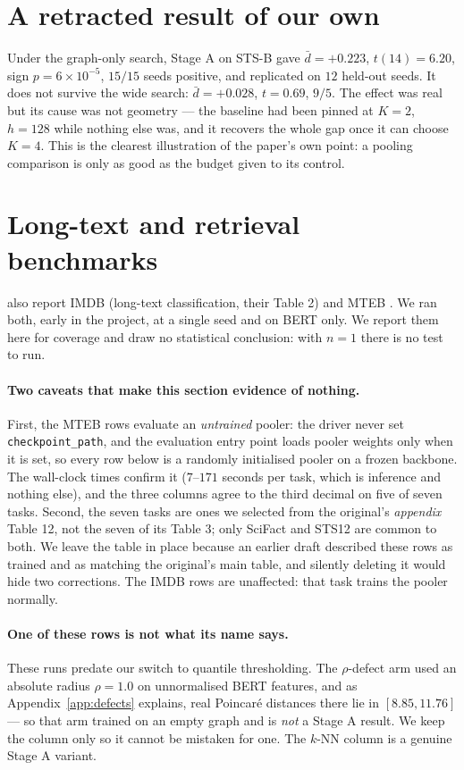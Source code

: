 \documentclass{article}
\begin{document}
\section{A retracted result of our own}
\label{app:narrow}

Under the graph-only search, Stage A on STS-B gave $\bar{d}=+0.223$,
$t(14)=6.20$, sign $p=6\times10^{-5}$, $15/15$ seeds positive, and replicated on
$12$ held-out seeds. It does not survive the wide search: $\bar{d}=+0.028$,
$t=0.69$, $9/5$. The effect was real but its cause was not geometry --- the
baseline had been pinned at $K=2$, $h=128$ while nothing else was, and it
recovers the whole gap once it can choose $K=4$. This is the clearest
illustration of the paper's own point: a pooling comparison is only as good as
the budget given to its control.

\section{Long-text and retrieval benchmarks}
\label{app:docmteb}

\citet{mantri2026glot} also report IMDB (long-text classification, their
Table 2) and MTEB \citep{muennighoff2022mteb}. We ran both, early in the
project, at a single seed and on BERT only. We report them here for coverage and
draw no statistical conclusion: with $n=1$ there is no test to run.

\paragraph{Two caveats that make this section evidence of nothing.} First, the
MTEB rows evaluate an \emph{untrained} pooler: the driver never set
\texttt{checkpoint\_path}, and the evaluation entry point loads pooler weights
only when it is set, so every row below is a randomly initialised pooler on a
frozen backbone. The wall-clock times confirm it ($7$--$171$ seconds per task,
which is inference and nothing else), and the three columns agree to the third
decimal on five of seven tasks. Second, the seven tasks are ones we selected
from the original's \emph{appendix} Table 12, not the seven of its Table 3;
only SciFact and STS12 are common to both. We leave the table in place because
an earlier draft described these rows as trained and as matching the original's
main table, and silently deleting it would hide two corrections. The IMDB rows
are unaffected: that task trains the pooler normally.

\paragraph{One of these rows is not what its name says.} These runs predate our
switch to quantile thresholding. The $\rho$-defect arm used an absolute radius
$\rho = 1.0$ on unnormalised BERT features, and as Appendix~\ref{app:defects}
explains, real Poincar\'e distances there lie in $[8.85, 11.76]$ --- so that arm
trained on an empty graph and is \emph{not} a Stage A result. We keep the column
only so it cannot be mistaken for one. The $k$-NN column is a genuine Stage A
variant.
\end{document}
